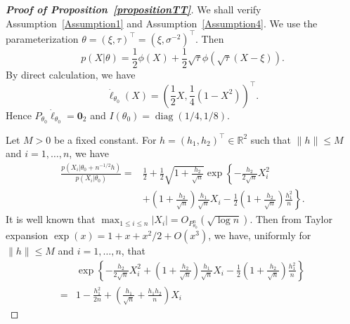 \documentclass[11pt]{article}
\DeclareMathOperator{\mydiag}{diag}
\newcommand{\myT}{\intercal}
\theoremstyle{plain}
\theoremstyle{definition}
\theoremstyle{remark}
\begin{document}
\begin{appendices}
\begin{proof}[\textbf{Proof of Proposition~\ref{propositionTT}}]
We shall verify Assumption~\ref{Assumption1} and Assumption~\ref{Assumption4}.
We use the parameterization
$
\theta=(\xi,\tau)^\myT  =(\xi,\sigma^{-2})^\myT $.
Then
\begin{equation*}
    p(X|\theta)=\frac{1}{2}\phi(X)+\frac{1}{2}\sqrt{\tau} \phi(\sqrt{\tau}(X-\xi)).
\end{equation*}
By direct calculation, we have 
\begin{equation*}
    \dot{\ell}_{\theta_0}(X)=\left(\frac{1}{2}X,\frac{1}{4}(1-X^2)\right)^\myT .
\end{equation*}
Hence $P_{\theta_0}\dot{\ell}_{\theta_0}=\mathbf{0}_2$ and
$I(\theta_0) = \mydiag (1/4, 1/8)$.

Let $M>0$ be a fixed constant.  For $h=(h_1,h_2)^\myT \in \mathbb{R}^2$ such that $\|h\|\leq M$ and $i=1,\ldots, n$, we have
\begin{equation*}
    \begin{split}
    \frac{p(X_i|\theta_0+n^{-1/2}h)}{p(X_i|\theta_0)}
    =&
    \frac{1}{2}+\frac{1}{2}\sqrt{1+\frac{h_2}{\sqrt{n}}} \exp\left\{-\frac{h_2}{2\sqrt{n}}X_i^2
    \right.
        \\
        &\left.+\left(1+\frac{h_2}{\sqrt{n}}\right) \frac{h_1}{\sqrt{n}} X_i-\frac{1}{2}\left(1+\frac{h_2}{\sqrt{n}}\right)\frac{h_1^2}{n}\right\}.
    \end{split}
\end{equation*}
It is well known that $\max_{1\leq i\leq n}|X_i|=O_{P^n_{\theta_0}}(\sqrt{\log n})$.
Then from Taylor expansion $\exp(x)=1+x+x^2/2+O(x^3)$, we have, uniformly for $\|h\|\leq M$ and $i=1,\ldots,n$, that
\begin{align*}
    &\exp\left\{-\frac{h_2}{2\sqrt{n}}X_i^2+\left(1+\frac{h_2}{\sqrt{n}}\right) \frac{h_1}{\sqrt{n}} X_i-\frac{1}{2}\left(1+\frac{h_2}{\sqrt{n}}\right)\frac{h_1^2}{n}\right\}
    \\
    =&
1
-\frac{h_1^2}{2n}
+\left(\frac{h_1}{\sqrt{n}}+\frac{h_1 h_2}{n}\right)  X_i

\end{align*}
\end{proof}
\end{appendices}
\end{document}

